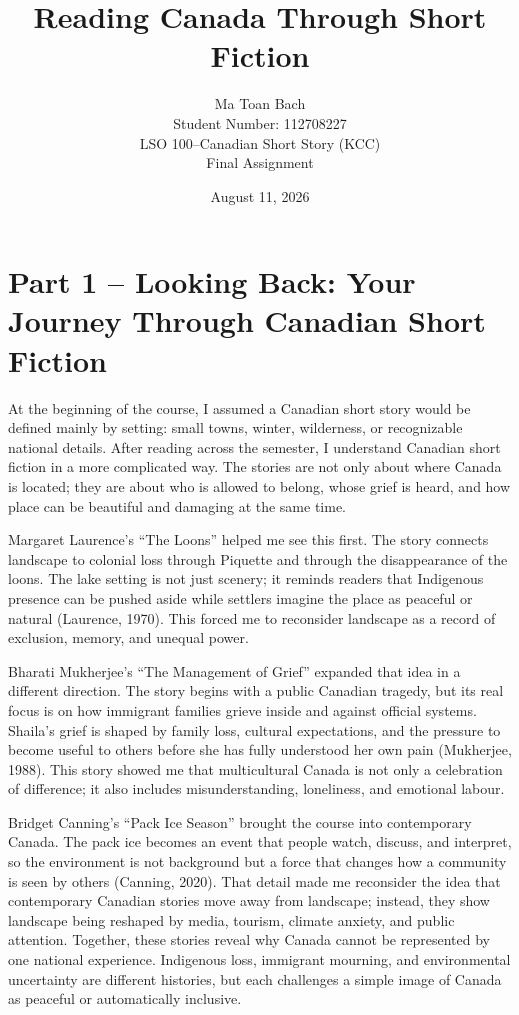 \documentclass[12pt]{article}
\title{Reading Canada Through Short Fiction}
\author{%
  Ma Toan Bach\\
  Student Number: 112708227\\
  LSO 100--Canadian Short Story (KCC)\\
  Final Assignment
}
\date{August 11, 2026}
\begin{document}
\maketitle

\section*{Part 1 -- Looking Back: Your Journey Through Canadian Short Fiction}

At the beginning of the course, I assumed a Canadian short story would be defined mainly by setting: small towns, winter, wilderness, or recognizable national details. After reading across the semester, I understand Canadian short fiction in a more complicated way. The stories are not only about where Canada is located; they are about who is allowed to belong, whose grief is heard, and how place can be beautiful and damaging at the same time.

Margaret Laurence's ``The Loons'' helped me see this first. The story connects landscape to colonial loss through Piquette and through the disappearance of the loons. The lake setting is not just scenery; it reminds readers that Indigenous presence can be pushed aside while settlers imagine the place as peaceful or natural (Laurence, 1970). This forced me to reconsider landscape as a record of exclusion, memory, and unequal power.

Bharati Mukherjee's ``The Management of Grief'' expanded that idea in a different direction. The story begins with a public Canadian tragedy, but its real focus is on how immigrant families grieve inside and against official systems. Shaila's grief is shaped by family loss, cultural expectations, and the pressure to become useful to others before she has fully understood her own pain (Mukherjee, 1988). This story showed me that multicultural Canada is not only a celebration of difference; it also includes misunderstanding, loneliness, and emotional labour.

Bridget Canning's ``Pack Ice Season'' brought the course into contemporary Canada. The pack ice becomes an event that people watch, discuss, and interpret, so the environment is not background but a force that changes how a community is seen by others (Canning, 2020). That detail made me reconsider the idea that contemporary Canadian stories move away from landscape; instead, they show landscape being reshaped by media, tourism, climate anxiety, and public attention. Together, these stories reveal why Canada cannot be represented by one national experience. Indigenous loss, immigrant mourning, and environmental uncertainty are different histories, but each challenges a simple image of Canada as peaceful or automatically inclusive.
\end{document}
